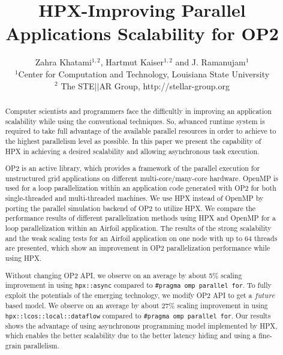 \documentclass[conference]{IEEEtran}
\begin{document}





%

\title{HPX-Improving Parallel Applications Scalability for OP2}
\author{Zahra Khatami$^{1,2}$, Hartmut Kaiser$^{1,2}$ and J. Ramanujam$^{1}$ \\$^{1}$Center for Computation and Technology, Louisiana State University\\$^{2}$ The STE$||$AR Group, http://stellar-group.org
}
   
\maketitle

\begin{abstract}

Computer scientists and programmers face the difficultly in improving an application scalability while using the conventional techniques. So, advanced runtime system is required to take full advantage of the available parallel resources in order to achieve to the highest parallelism level as possible. In this paper we present the capability of HPX in achieving a desired scalability and allowing asynchronous task execution.

OP2 is an active library, which provides a framework of the parallel execution for unstructured grid applications on different multi-core/many-core hardware.  OpenMP is used for a loop parallelization within an application code generated with OP2 for both single-threaded and multi-threaded machines. We use HPX instead of OpenMP by porting the parallel simulation backend of OP2 to utilize HPX. We compare the performance results of different parallelization methods using HPX and OpenMP for a loop parallelization within an Airfoil application. The results of the strong scalability and the weak scaling tests for an Airfoil application on one node with up to 64 threads are presented, which show an improvement in OP2 parallelization performance while using HPX. 

Without changing OP2 API, we observe on an average by about 5\% scaling improvement in using \texttt{hpx::async} compared to \texttt{\#pragma omp parallel for}. To fully exploit the potentials of the emerging technology, we modify OP2 API to get a $future$ based model. We observe on an average by about 27\% scaling improvement in using \texttt{hpx::lcos::local::dataflow} compared to \texttt{\#pragma omp parallel for}. Our results shows the advantage of using asynchronous programming model implemented by HPX, which enables the better scalability due to the better latency hiding and using a fine-grain parallelism.




\end{abstract}
\end{document}

